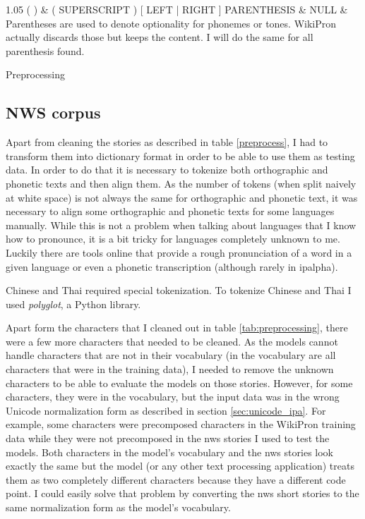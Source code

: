 {\begin{tabularx}{1.05\textwidth}
\hline
( ) 						& \scriptsize{( SUPERSCRIPT ) [ LEFT | RIGHT ] PARENTHESIS}		& NULL							& Parentheses are used to denote optionality for phonemes or tones. WikiPron actually discards those but keeps the content. I will do the same for all parenthesis found.  \\\hline
\end{tabularx}}{Preprocessing}

\subsection*{NWS corpus}
Apart from cleaning the stories as described in table \ref{preprocess}, I had to transform them into dictionary format in order to be able to use them as testing data. In order to do that it is necessary to tokenize both orthographic and phonetic texts and then align them. As the number of tokens (when split naively at white space) is not always the same for orthographic and phonetic text, it was necessary to align some orthographic and phonetic texts for some languages manually. While this is not a problem when talking about languages that I know how to pronounce, it is a bit tricky for languages completely unknown to me. Luckily there are tools online that provide a rough pronunciation of a word in a given language or even a phonetic transcription (although rarely in \ac{ipalpha}). 

Chinese and Thai required special tokenization. To tokenize Chinese and Thai I used \textit{polyglot}, a Python library.

Apart form the characters that I cleaned out in table \ref{tab:preprocessing}, there were a few more characters that needed to be cleaned. 
As the models cannot handle characters that are not in their vocabulary (in the vocabulary are all characters that were in the training data), I needed to remove the unknown characters to be able to evaluate the models on those stories. However, for some characters, they were in the vocabulary, but the input data was in the wrong Unicode normalization form as described in section \ref{sec:unicode_ipa}. For example, some characters were precomposed characters in the WikiPron training data while they were not precomposed in the \ac{nws} stories I used to test the models. Both characters in the model's vocabulary and the \ac{nws} stories look exactly the same but the model (or any other text processing application) treats them as two completely different characters because they have a different code point. I could easily solve that problem by converting the \ac{nws} short stories to the same normalization form as the model's vocabulary.


